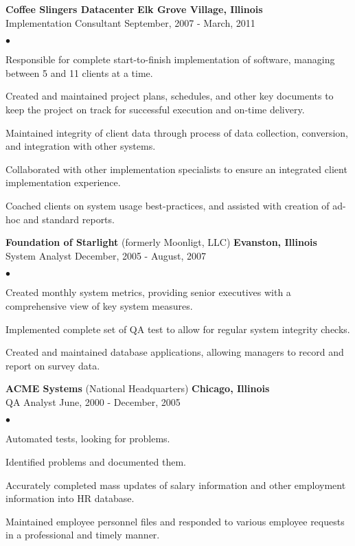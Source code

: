 \documentclass[margin,line]{res}
\newenvironment{list2}{
  \begin{list}{$\bullet$}{%
      \setlength{\itemsep}{0in} 
      \setlength{\parsep}{0in} \setlength{\parskip}{0in}
      \setlength{\topsep}{0in} \setlength{\partopsep}{0in} 
      \setlength{\leftmargin}{0.2in}}}{\end{list}}
\begin{document}
\begin{resume}
{\bf Coffee Slingers Datacenter} 	\hfill {\bf Elk Grove Village, Illinois}\\
\vspace{-.3cm}
{Implementation Consultant}       \hfill {September, 2007 - March, 2011}\\
\vspace*{-.0in}
\begin{list2}
\item Responsible for complete start-to-finish implementation of software, 
  managing between 5 and 11 clients at a time.
\item Created and maintained project plans, schedules, and other key documents 
  to keep the project on track for successful execution and on-time delivery.
\item Maintained integrity of client data through process of data collection, 
  conversion, and integration with other systems.
\item Collaborated with other implementation specialists to ensure an 
  integrated client implementation experience.
\item Coached clients on system usage best-practices, and assisted with 
  creation of ad-hoc and standard reports.
\end{list2}

{\bf Foundation of Starlight} (formerly Moonligt, LLC) \hfill {\bf Evanston, 
  Illinois}\\
\vspace{-.3cm}
{System Analyst} \hfill {December, 2005 - August, 2007}\\
\vspace*{-.0in}
\begin{list2}
\item Created monthly system metrics, providing senior executives 
  with a comprehensive view of key system measures.
\item Implemented complete set of QA test to allow for regular 
  system integrity checks.
\item Created and maintained database applications, allowing managers to record 
  and report on survey data.
\end{list2}

\newpage
{\bf ACME Systems} (National Headquarters) \hfill {\bf Chicago, Illinois}\\
\vspace{-.3cm}
{QA Analyst} \hfill {June, 2000 - December, 2005}\\ 
\vspace*{-.0in}
\begin{list2}
\item Automated tests, looking for problems.
\item Identified problems and documented them.
\item Accurately completed mass updates of salary information and other employment
  information into HR database.
\item Maintained employee personnel files and responded to various employee 
  requests in a professional and timely manner.
\end{list2}


\end{resume}
\end{document}
